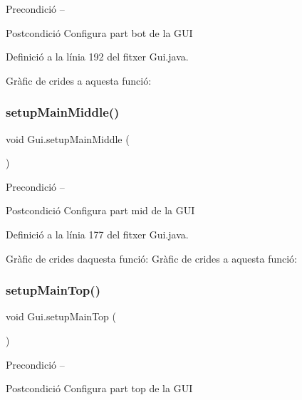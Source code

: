 \begin{DoxyPrecond}{Precondició}
-- 
\end{DoxyPrecond}
\begin{DoxyPostcond}{Postcondició}
Configura part bot de la G\+UI 
\end{DoxyPostcond}


Definició a la línia 192 del fitxer Gui.\+java.

Gràfic de crides a aquesta funció\+:
\mbox{\label{class_gui_a0487820e6936c7fe1f38acf0d0ad1d8a}} 
\subsubsection{\texorpdfstring{setup\+Main\+Middle()}{setupMainMiddle()}}
{\footnotesize\ttfamily void Gui.\+setup\+Main\+Middle (\begin{DoxyParamCaption}{ }\end{DoxyParamCaption})\hspace{0.3cm}{\ttfamily [private]}}

\begin{DoxyPrecond}{Precondició}
-- 
\end{DoxyPrecond}
\begin{DoxyPostcond}{Postcondició}
Configura part mid de la G\+UI 
\end{DoxyPostcond}


Definició a la línia 177 del fitxer Gui.\+java.

Gràfic de crides d\textquotesingle{}aquesta funció\+:
Gràfic de crides a aquesta funció\+:
\mbox{\label{class_gui_a9213a84890405b2cd77441b7f0654318}} 
\subsubsection{\texorpdfstring{setup\+Main\+Top()}{setupMainTop()}}
{\footnotesize\ttfamily void Gui.\+setup\+Main\+Top (\begin{DoxyParamCaption}{ }\end{DoxyParamCaption})\hspace{0.3cm}{\ttfamily [private]}}

\begin{DoxyPrecond}{Precondició}
-- 
\end{DoxyPrecond}
\begin{DoxyPostcond}{Postcondició}
Configura part top de la G\+UI 
\end{DoxyPostcond}


